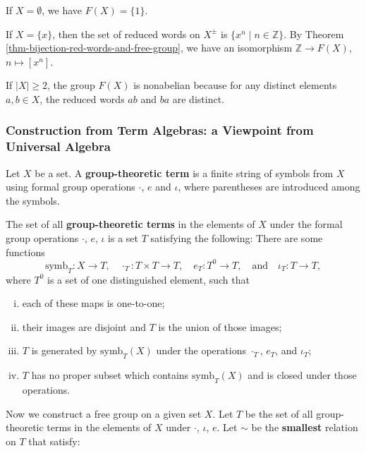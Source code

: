 \begin{example}
	If $X = \emptyset$, we have $F(X) = \{1\}$.
	
	If $X = \{x\}$, then the set of reduced words on $X^{\pm}$ is $\{x^n\mid n\in\mathbb{Z}\}$. By Theorem \ref{thm-bijection-red-words-and-free-group}, we have an isomorphism $\mathbb{Z}\to F(X)$, $n\mapsto [x^n]$.
	
	If $|X|\geq 2$, the group $F(X)$ is nonabelian because for any distinct elements $a,b\in X$, the reduced words $ab$ and $ba$ are distinct.
\end{example}

 

\subsubsection{Construction from Term Algebras: a Viewpoint from Universal Algebra}
\begin{definition}
	Let $X$ be a set. A \textbf{group-theoretic term} is a finite string of symbols from $X$ using formal group operations $\cdot$, $e$ and $\iota$, where  parentheses are introduced among the symbols.
\end{definition}

\begin{definition}
 The set of all \textbf{group-theoretic terms} in the elements of $X$ under the formal group operations $\cdot$, $e$, $\iota$ is a set $T$ satisfying the following: There are some functions
 \[
 \text{symb}_T: X \to T, \quad \cdot_T: T\times T \to T, \quad e_T: T^0 \to T, \quad \text{and} \quad \iota_T: T \to T,
 \]
 where $T^0$ is a set of one distinguished element, such that
\begin{enumerate}[(i)]
	\item  each of these maps is one-to-one;
	\item  their images are disjoint and $T$ is the union of those images; 
	\item $T$ is generated by $\text{symb}_T(X)$ under the operations $\cdot_T$, $e_T$, and $\iota_T$;
	\item $T$ has no proper subset which contains $\text{symb}_T(X)$ and is closed under those operations.
\end{enumerate}
\end{definition}

Now we construct a free group on a given set $X$. Let $T$ be the set of all group-theoretic terms in the elements of $X$ under $\cdot$, $\iota$, $e$. Let $\sim$ be the \textbf{smallest} relation on $T$ that satisfy:

